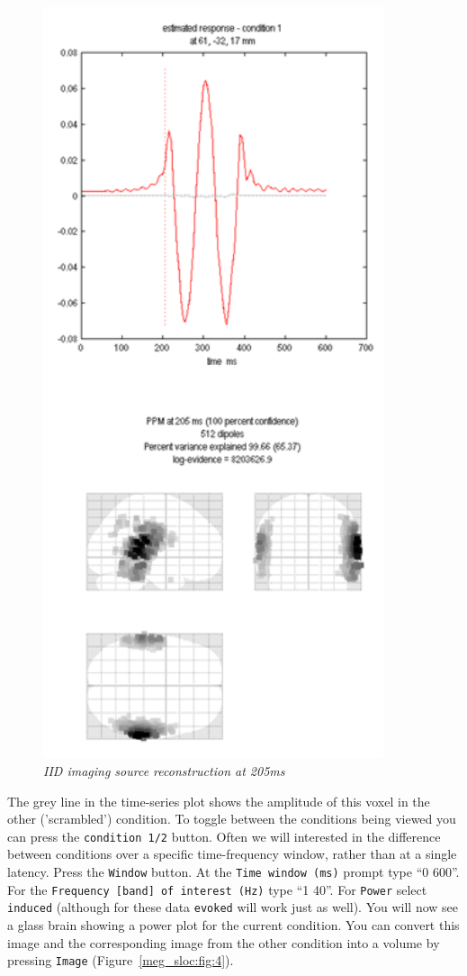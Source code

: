 \begin{figure}
\begin{center}
\includegraphics[width=100mm]{meg_sloc/slide3}
\caption{\em IID imaging source reconstruction at 205ms \label{meg_sloc:fig:3}}
\end{center}
\end{figure}

The grey line in the time-series plot shows the amplitude of this voxel in the other ('scrambled') condition. To toggle between the conditions being viewed you can press the \texttt{condition 1/2} button.
Often we will interested in the difference between conditions over a specific time-frequency window, rather than at a single latency. Press the \texttt{Window} button. At the \texttt{Time window (ms)} prompt type ``0 600''. For the \texttt{Frequency [band] of interest (Hz)} type ``1 40''. For \texttt{Power} select \texttt{induced} (although for these data \texttt{evoked} will work just as well). You will now see a glass brain showing a power plot for the current condition. You can convert this image and the corresponding image from the other condition into a volume by pressing \texttt{Image} (Figure~\ref{meg_sloc:fig:4}).

